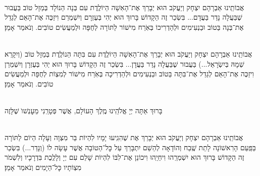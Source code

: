 \documentclass[twoside, openany, parskip=half, 11pt]{book}
\begin{document}
\misheberakhcholim{}

\vspace{\baselineskip}
\begin{small}
\\
אֲבוֹתֵֽינוּ אַבְרָהָם יִצְחָק וְיַעֲקֹב הוּא יְבָרֵךְ אֶת־הָאִשָׁה הַיוֹלֶֽדֶת
עִם בְּנָה הַנוֹלָד בְּמַזָל טוֹב בַּעֲבוּר שֶׁבַּעֲלָה נָדַר בַּעֲדָם... בִּשְׂכַר זֶה הַקָדוֹשׁ בָּרוּךְ הוּא יְהִי בְּעֶזְרָם וְיִשְׁמְרֵם וִיזַכֶּה אֶת־הָאֵם לְגַדֵל אֶת־בְּנָה בַּטוֹב וּבַנְעִימִים וּלְהַדְרִיכוֹ בְּאֹֽרַח מִישׁוֹר לַתּוֹרָה לְחֻפָּה וּלְמַעֲשִׂים טוֹבִים. וְנֹאמַר אָמֵן׃

\\
אֲבוֹתֵֽינוּ אַבְרָהָם יִצְחָק וְיַעֲקֹב הוּא יְבָרֵךְ אֶת־הָאִשָׁה הַיוֹלֶֽדֶת
עִם בִּתָּה הַנוֹלֶֽדֶת בְּמַזָל טוֹב (וְיִקָרֵא שְׁמָהּ בְּיִשְׂרָאֵל...) בַּעֲבוּר שֶׁבַּעֲלָה נָדַר בַּעֲדָן... בִּשְׂכַר זֶה הַקָדוֹשׁ בָּרוּךְ הוּא יְהִי בְּעֶזְרָן וְיִשְׁמְרֵן וִיזַכֶּה אֶת־הָאֵם לְגַדֵל אֶת־בִּתָּה בַּטוֹב ובַנְעִימִים וּלְהַדְרִיכָה בְּאֹֽרַח מִישׁוֹר לְמִצְוֹת לְחֻפָּה וּלְמַעֲשִׂים טוֹבִים. וְנֹאמַר אָמֵן׃


\\
בָּרוּךְ אַתָּה יְיָ אֱלֹהֵֽינוּ מֶֽלֶךְ הָעוֹלָם, אֲשֶׁר פְּטָרַֽנִי מֵעׇנְשׁוׂ שֶׁלָּזֶה

\\
אֲבוֹתֵֽינוּ אַבְרָהָם יִצְחָק וְיַעֲקֹב הוּא יְבָרֵךְ אֶת
שֶׁהִגִֽיעוּ יָמָיו לִהְיוֹת בַּר מִצְוָה וְעָלָה הַיוֹם לַתּוֹרָה בַּפַּֽעַם הָרִאשׁוֹנָה לָתֵת שֶֽׁבַח וְהוֹדָאָה לְהַשֵׁם יִתְבָּרַךְ עַל כׇּל־הַטוֹבָה אֲשֶׁר עָשָׂה לוֹ (וְנָדַר...) בִּשְׂכַר זֶה הַקָדוֹשׁ בָּרוּךְ הוּא יִשְׁמְרֵֽהוּ וִיחַיֵֽהוּ וִיכוֹנֵן אֶת־לִבּוֹ לִהְיוֹת שָׁלֵם עִם יְיָ וְלָלֶֽכֶת בִּדְרָכָיו וְלִשְׁמֹר מִצְוֹתָיו כׇּל־הַיָמִים וְנֹאמַר אָמֵן׃
\end{small}



\sepline

\\
\halfkaddish


\newcommand{\hagbaha}{
\instruction{הגבה:}
\firstword{וְזֹ֖את הַתּוֹרָ֑ה}\source{דברים ד}
אֲשֶׁר־שָׂ֣ם מֹשֶׁ֔ה לִפְנֵ֖י בְּנֵ֥י יִשְׂרָאֵֽל׃
עַל־פִּ֥י \source{במדבר ט}יְיָ֖ בְּיַד־מֹשֶֽׁה׃
עֵץ־חַיִּ֣ים \source{משלי ג} הִ֭יא לַמַּחֲזִיקִ֣ים בָּ֑הּ וְֽתֹמְכֶ֥יהָ מְאֻשָּֽׁר׃
דְּרָכֶ֥יהָ דַרְכֵי־נֹ֑עַם וְֽכׇל־נְתִ֖יבוֹתֶ֣יהָ שָׁלֽוֹם׃
אֹ֣רֶךְ יָ֭מִים בִּֽימִינָ֑הּ בִּ֝שְׂמֹאולָ֗הּ עֹ֣שֶׁר וְכָבֽוֹד׃
יְיָ֥ \source{ישעיה מב}חָפֵ֖ץ לְמַ֣עַן צִדְק֑וֹ יַגְדִּ֥יל תּוֹרָ֖ה וְיַאְדִּֽיר׃

}
\end{document}
